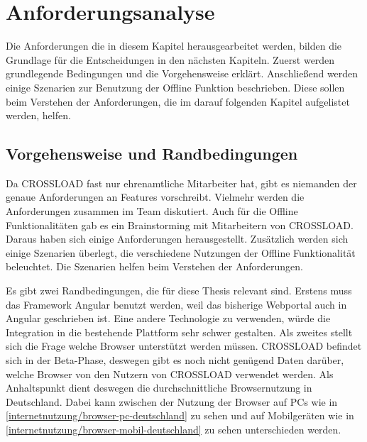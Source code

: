 \chapter{Anforderungsanalyse}
\label{Kap3}
Die Anforderungen die in diesem Kapitel herausgearbeitet werden, bilden die Grundlage für die Entscheidungen in den nächsten Kapiteln. Zuerst werden grundlegende Bedingungen und die Vorgehensweise erklärt. Anschließend werden einige Szenarien zur Benutzung der Offline Funktion beschrieben. Diese sollen beim Verstehen der Anforderungen, die im darauf folgenden Kapitel aufgelistet werden, helfen.

\section{Vorgehensweise und Randbedingungen}
Da CROSSLOAD fast nur ehrenamtliche Mitarbeiter hat, gibt es niemanden der genaue Anforderungen an Features vorschreibt. Vielmehr werden die Anforderungen zusammen im Team diskutiert. Auch für die Offline Funktionalitäten gab es ein Brainstorming mit Mitarbeitern von CROSSLOAD. Daraus haben sich einige Anforderungen herausgestellt. Zusätzlich werden sich einige Szenarien überlegt, die verschiedene Nutzungen der Offline Funktionalität beleuchtet. Die Szenarien helfen beim Verstehen der Anforderungen.

Es gibt zwei Randbedingungen, die für diese Thesis relevant sind. Erstens muss das Framework Angular benutzt werden, weil das bisherige Webportal auch in Angular geschrieben ist. Eine andere Technologie zu verwenden, würde die Integration in die bestehende Plattform sehr schwer gestalten. Als zweites stellt sich die Frage welche Browser unterstützt werden müssen. CROSSLOAD befindet sich in der Beta-Phase, deswegen gibt es noch nicht genügend Daten darüber, welche Browser von den Nutzern von CROSSLOAD verwendet werden. Als Anhaltspunkt dient deswegen die durchschnittliche Browsernutzung in Deutschland. Dabei kann zwischen der Nutzung der Browser auf PCs wie in \autoref{internetnutzung/browser-pc-deutschland} zu sehen und auf Mobilgeräten wie in \autoref{internetnutzung/browser-mobil-deutschland} zu sehen unterschieden werden.



